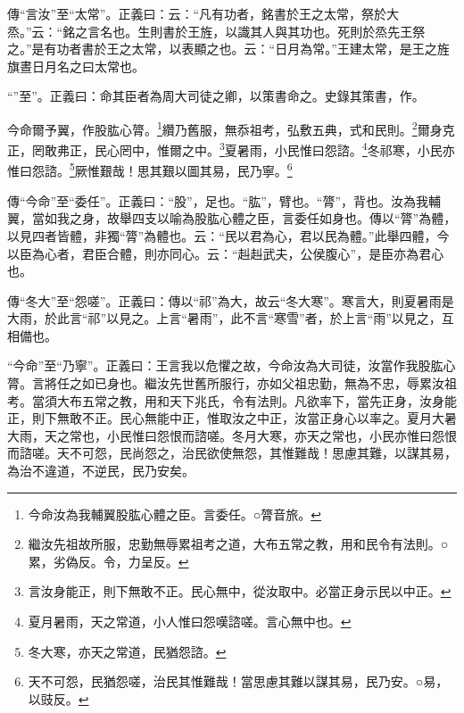 {\noindent\zhuan{}\fzbyks 傳“言汝”至“太常”。正義曰：云：“凡有功者，銘書於王之太常，祭於大烝。”云：“銘之言名也。生則書於王旌，以識其人與其功也。死則於烝先王祭之。”是有功者書於王之太常，以表顯之也。云：“日月為常。”王建太常，是王之旌旗晝日月名之曰太常也。 \par}

{\noindent\shu{}\fzkt “”至”。正義曰：命其臣者為周大司徒之卿，以策書命之。史錄其策書，作。 \par}

今命爾予翼，作股肱心膂。\footnote{今命汝為我輔翼股肱心體之臣。言委任。○膂音旅。}纘乃舊服，無忝祖考，弘敷五典，式和民則。\footnote{繼汝先祖故所服，忠勤無辱累祖考之道，大布五常之教，用和民令有法則。○累，劣偽反。令，力呈反。}爾身克正，罔敢弗正，民心罔中，惟爾之中。\footnote{言汝身能正，則下無敢不正。民心無中，從汝取中。必當正身示民以中正。}夏暑雨，小民惟曰怨諮。\footnote{夏月暑雨，天之常道，小人惟曰怨嘆諮嗟。言心無中也。}冬祁寒，小民亦惟曰怨諮。\footnote{冬大寒，亦天之常道，民猶怨諮。}厥惟艱哉！思其艱以圖其易，民乃寧。\footnote{天不可怨，民猶怨嗟，治民其惟難哉！當思慮其難以謀其易，民乃安。○易，以豉反。}


{\noindent\zhuan{}\fzbyks 傳“今命”至“委任”。正義曰：“股”，足也。“肱”，臂也。“膂”，背也。汝為我輔翼，當如我之身，故舉四支以喻為股肱心體之臣，言委任如身也。傳以“膂”為體，以見四者皆體，非獨“膂”為體也。云：“民以君為心，君以民為體。”此舉四體，今以臣為心者，君臣合體，則亦同心。云：“赳赳武夫，公侯腹心”，是臣亦為君心也。 \par}

{\noindent\zhuan{}\fzbyks 傳“冬大”至“怨嗟”。正義曰：傳以“祁”為大，故云“冬大寒”。寒言大，則夏暑雨是大雨，於此言“祁”以見之。上言“暑雨”，此不言“寒雪”者，於上言“雨”以見之，互相備也。 \par}

{\noindent\shu{}\fzkt “今命”至“乃寧”。正義曰：王言我以危懼之故，今命汝為大司徒，汝當作我股肱心膂。言將任之如已身也。繼汝先世舊所服行，亦如父祖忠勤，無為不忠，辱累汝祖考。當須大布五常之教，用和天下兆氏，令有法則。凡欲率下，當先正身，汝身能正，則下無敢不正。民心無能中正，惟取汝之中正，汝當正身心以率之。夏月大暑大雨，天之常也，小民惟曰怨恨而諮嗟。冬月大寒，亦天之常也，小民亦惟曰怨恨而諮嗟。天不可怨，民尚怨之，治民欲使無怨，其惟難哉！思慮其難，以謀其易，為治不違道，不逆民，民乃安矣。 \par}

